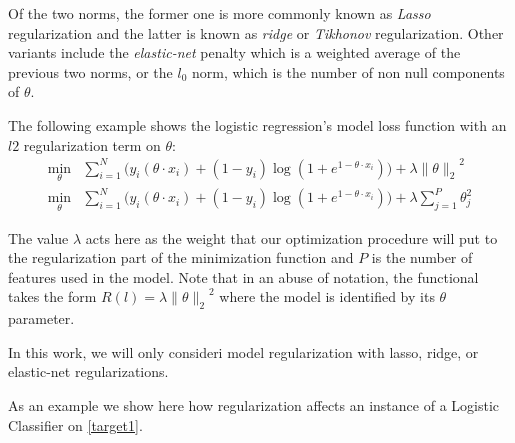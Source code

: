 Of the two norms, the former one is more commonly known as \textit{ Lasso} regularization and the latter is known as \textit{ridge} or \textit{Tikhonov} regularization.
Other variants include the \textit{elastic-net} penalty which is a weighted average of the previous two norms, or the $l_0$ norm, which is the number of non null components of $\theta$.


The following example shows the logistic regression's model loss function with an $l2$ regularization term on $\theta$:
\begin{equation}
\begin{split}
\min_{\theta} & \sum_{i=1}^N \big(y_i ( \theta \cdot x_i ) + (1- y_i)\log(1 + e^{1- \theta \cdot x_i} ) \big) + \lambda { \| \theta \|_{2}}^2 \\
\min_{\theta} & \sum_{i=1}^N \big(y_i ( \theta \cdot x_i ) + (1- y_i)\log(1 + e^{1- \theta \cdot x_i} ) \big) + \lambda \sum_{j=1}^P \theta_j^2
\end{split}
\label{eq:logitRegularization}
\end{equation}




The value $\lambda$ acts here as the weight that our optimization procedure will put to the regularization part of the minimization function and $P$ is the number of features used in the model.
Note that in an abuse of notation, the functional takes the form $R(l) = \lambda { \| \theta \|_{2}}^2$ where the model is identified by its $\theta$ parameter.

In this work, we will only consideri model regularization with lasso, ridge, or elastic-net regularizations.

As an example we show here how regularization affects an instance of a Logistic Classifier on \cref{target1}.

